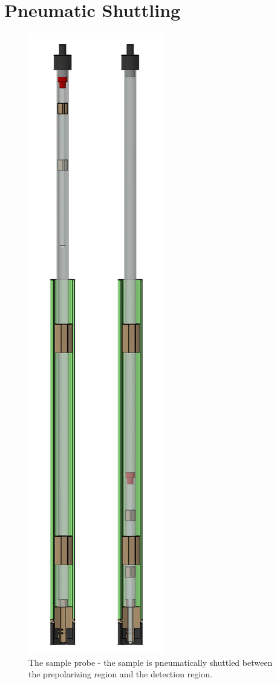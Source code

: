 \documentclass[PaulGanssle-Thesis.tex]{subfiles}
\begin{document}
\section{Pneumatic Shuttling}
\label{nmr.pneumatic}
\begin{figure}
\includegraphics[width=0.2\tw]{figures/magnetometer/FullProbeShuttled.png}
\caption{The sample probe - the sample is pneumatically shuttled between the prepolarizing region and the detection region.}
\label{fig:nmr.probe}
\vspace*{-0.6\lineheight}
\end{figure}
\end{document}
